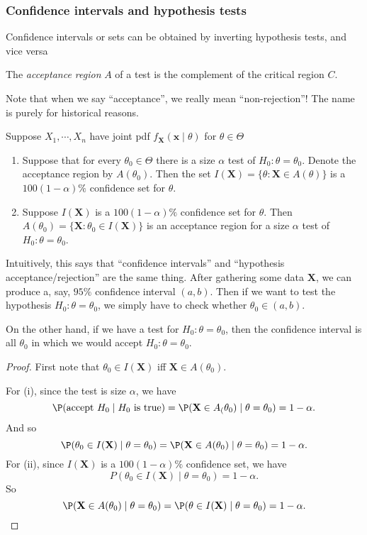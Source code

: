 \documentclass[a4paper]{article}
\begin{document}
\subsubsection{Confidence intervals and hypothesis tests}
Confidence intervals or sets can be obtained by inverting hypothesis tests, and vice versa

\begin{defi}
  The \emph{acceptance region} $A$ of a test is the complement of the critical region $C$.

  Note that when we say ``acceptance'', we really mean ``non-rejection''! The name is purely for historical reasons.
\end{defi}
Suppose $X_1, \cdots, X_n$ have joint pdf $f_\mathbf{X}(\mathbf{x}\mid \theta)$ for $\theta\in \Theta$

\begin{thm}\leavevmode
  \begin{enumerate}
    \item Suppose that for every $\theta_0\in \Theta$ there is a size $\alpha$ test of $H_0: \theta = \theta_0$. Denote the acceptance region by $A(\theta_0)$. Then the set $I(\mathbf{X}) = \{\theta:\mathbf{X}\in A(\theta)\}$ is a $100(1 - \alpha)\%$ confidence set for $\theta$.
    \item Suppose $I(\mathbf{X})$ is a $100(1 - \alpha)\%$ confidence set for $\theta$. Then $A(\theta_0) = \{\mathbf{X}: \theta_0 \in I(\mathbf{X})\}$ is an acceptance region for a size $\alpha$ test of $H_0: \theta = \theta_0$.
  \end{enumerate}
\end{thm}
Intuitively, this says that ``confidence intervals'' and ``hypothesis acceptance/rejection'' are the same thing. After gathering some data $\mathbf{X}$, we can produce a, say, $95\%$ confidence interval $(a, b)$. Then if we want to test the hypothesis $H_0: \theta = \theta_0$, we simply have to check whether $\theta_0 \in (a, b)$.

On the other hand, if we have a test for $H_0: \theta = \theta_0$, then the confidence interval is all $\theta_0$ in which we would accept $H_0: \theta = \theta_0$.
\begin{proof}
  First note that $\theta_0\in I(\mathbf{X})$ iff $\mathbf{X}\in A(\theta_0)$.

  For (i), since the test is size $\alpha$, we have
  \[
    \P(\text{accept }H_0\mid H_0\text{ is true}) = \P(\mathbf{X}\in A_(\theta_0)\mid \theta=\theta_0) = 1 - \alpha.
  \]
  And so
  \[
    \P(\theta_0\in I(\mathbf{X})\mid \theta = \theta_0) = \P(\mathbf{X}\in A(\theta_0)\mid \theta = \theta_0) = 1 - \alpha.
  \]
  For (ii), since $I(\mathbf{X})$ is a $100(1 - \alpha)\%$ confidence set, we have
  \[
    P(\theta_0\in I(\mathbf{X})\mid \theta = \theta_0) = 1- \alpha.
  \]
  So
  \[
    \P(\mathbf{X}\in A(\theta_0)\mid \theta = \theta_0) = \P(\theta\in I(\mathbf{X})\mid \theta = \theta_0) = 1- \alpha.
  \]
\end{proof}
\end{document}
